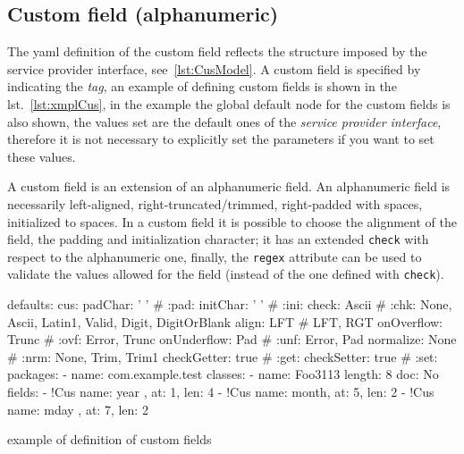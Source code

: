 \documentclass[a4paper,10pt]{report}
\newenvironment{elisting}[1][H]
  {\captionsetup{aboveskip=0pt}\begin{listing}[#1]}
  {\end{listing}%
}
\begin{document}
\subsection{Custom field (alphanumeric)} \label{sub:yaml.cus}
The yaml definition of the custom field reflects the structure 
imposed by the service provider interface, see~\ref{lst:CusModel}.
A custom field is specified by indicating the 
 \textsl{tag}, an example of defining 
custom fields is shown in the lst.~\ref{lst:xmplCus}, in the 
example the global default node for the custom fields is also shown, the values 
set are the default ones of the \textsl{service provider interface}, therefore 
it is not necessary to explicitly set the parameters if you want to set these 
values.

A custom field is an extension of an alphanumeric field. An alphanumeric field 
is necessarily left-aligned, right-truncated/trimmed, right-padded with spaces, 
initialized to spaces. In a custom field it is possible to choose the alignment 
of the field, the padding and initialization character; it has an extended 
\texttt{check} with respect to the alphanumeric one, finally, the \texttt{regex} 
attribute can be used to validate the values allowed for the field (instead of 
the one defined with \texttt{check}).

\begin{elisting}[!htb]
\begin{yamlcode}
defaults:
  cus:
    padChar: ' '        # :pad:
    initChar: ' '       # :ini:
    check: Ascii        # :chk: None, Ascii, Latin1, Valid, Digit, DigitOrBlank
    align: LFT          # LFT, RGT
    onOverflow: Trunc   # :ovf: Error, Trunc
    onUnderflow: Pad    # :unf: Error, Pad
    normalize: None     # :nrm: None, Trim, Trim1
    checkGetter: true   # :get:
    checkSetter: true   # :set:
packages:
  - name: com.example.test
    classes:
      - name: Foo3113
        length: 8
        doc: No
        fields:
          - !Cus { name: year , at: 1, len: 4 }
          - !Cus { name: month, at: 5, len: 2 }
          - !Cus { name: mday , at: 7, len: 2 }
\end{yamlcode}
\caption{example of definition of custom fields}
\label{lst:xmplCus}
\end{elisting}
\end{document}
